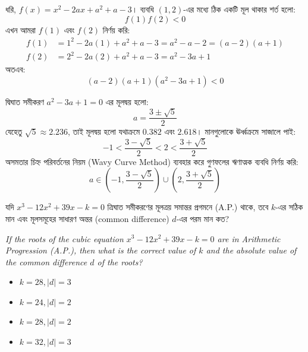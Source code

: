 \documentclass[12pt, a4paper]{article}
\begin{document}
\begin{tcolorbox}[solutionbox={সমাধান (Solution)}]
    \noindent
    ধরি, $f(x) = x^2 - 2ax + a^2 + a - 3$। ব্যবধি $(1, 2)$-এর মধ্যে ঠিক একটি মূল থাকার শর্ত হলো:
    \[ f(1)f(2) < 0 \]
    এখন আমরা $f(1)$ এবং $f(2)$ নির্ণয় করি:
    \begin{align*}
        f(1) &= 1^2 - 2a(1) + a^2 + a - 3 = a^2 - a - 2 = (a-2)(a+1) \\
        f(2) &= 2^2 - 2a(2) + a^2 + a - 3 = a^2 - 3a + 1
    \end{align*}
    অতএব:
    \[ (a-2)(a+1)(a^2 - 3a + 1) < 0 \]
    
    \vspace{0.5em}
    দ্বিঘাত সমীকরণ $a^2 - 3a + 1 = 0$ এর মূলদ্বয় হলো:
    \[ a = \frac{3 \pm \sqrt{5}}{2} \]
    যেহেতু $\sqrt{5} \approx 2.236$, তাই মূলদ্বয় হলো যথাক্রমে $0.382$ এবং $2.618$। মানগুলোকে ঊর্ধ্বক্রমে সাজালে পাই:
    \[ -1 < \frac{3-\sqrt{5}}{2} < 2 < \frac{3+\sqrt{5}}{2} \]
    অসমতার চিহ্ন পরিবর্তনের নিয়ম (Wavy Curve Method) ব্যবহার করে গুণফলের ঋণাত্মক ব্যবধি নির্ণয় করি:
    \[ a \in \left(-1, \frac{3-\sqrt{5}}{2}\right) \cup \left(2, \frac{3+\sqrt{5}}{2}\right) \]
\end{tcolorbox}
\vspace{1em}

\begin{tcolorbox}[questionbox={প্রশ্ন (Question) 42}]
    \noindent
    যদি $x^3 - 12x^2 + 39x - k = 0$ ত্রিঘাত সমীকরণের মূলত্রয় সমান্তর প্রগমনে (A.P.) থাকে, তবে $k$-এর সঠিক মান এবং মূলসমূহের সাধারণ অন্তর (common difference) $d$-এর পরম মান কত?
    
    \vspace{0.8em}
    \begin{english}
    \noindent\textit{\color{darkgray}
    If the roots of the cubic equation $x^3 - 12x^2 + 39x - k = 0$ are in Arithmetic Progression (A.P.), then what is the correct value of $k$ and the absolute value of the common difference $d$ of the roots?
    }
    \end{english}
\end{tcolorbox}

\begin{itemize}[label={}, leftmargin=1cm, itemsep=0.5em]
    \item[\textbf{A)}] $k = 28, |d| = 3$
    \item[\textbf{B)}] $k = 24, |d| = 2$
    \item[\textbf{C)}] $k = 28, |d| = 2$
    \item[\textbf{D)}] $k = 32, |d| = 3$
\end{itemize}
\end{document}
